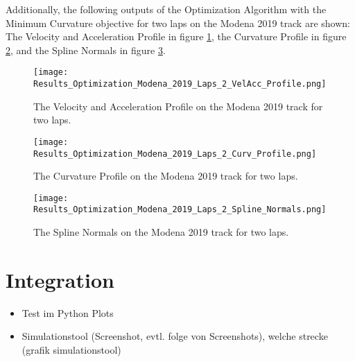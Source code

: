 Additionally, the following outputs of the Optimization Algorithm with the Minimum Curvature objective for two laps on the Modena 2019 track are shown: The Velocity and Acceleration Profile in figure \ref{fig:Results Modena 2019 Laps 2 VelAcc Profile}, the Curvature Profile in figure \ref{fig:Results Modena 2019 Laps 2 Curv Profile}, and the Spline Normals in figure \ref{fig:Results Modena 2019 Laps 2 Spline Normals}.
\begin{figure}[H]
    \centering
    \texttt{[image: Results\_Optimization\_Modena\_2019\_Laps\_2\_VelAcc\_Profile.png]}
    \caption{The Velocity and Acceleration Profile on the Modena 2019 track for two laps.}
    \label{fig:Results Modena 2019 Laps 2 VelAcc Profile}
\end{figure}
\begin{figure}[H]
    \centering
    \texttt{[image: Results\_Optimization\_Modena\_2019\_Laps\_2\_Curv\_Profile.png]}
    \caption{The Curvature Profile on the Modena 2019 track for two laps.}
    \label{fig:Results Modena 2019 Laps 2 Curv Profile}
\end{figure}
\begin{figure}[H]
    \centering
    \texttt{[image: Results\_Optimization\_Modena\_2019\_Laps\_2\_Spline\_Normals.png]}
    \caption{The Spline Normals on the Modena 2019 track for two laps.}
    \label{fig:Results Modena 2019 Laps 2 Spline Normals}
\end{figure}

\pagebreak

\section{Integration} 
\begin{itemize}
    \item Test im Python Plots
    \item Simulationstool (Screenshot, evtl. folge von Screenshots), welche strecke (grafik simulationstool)
\end{itemize}

